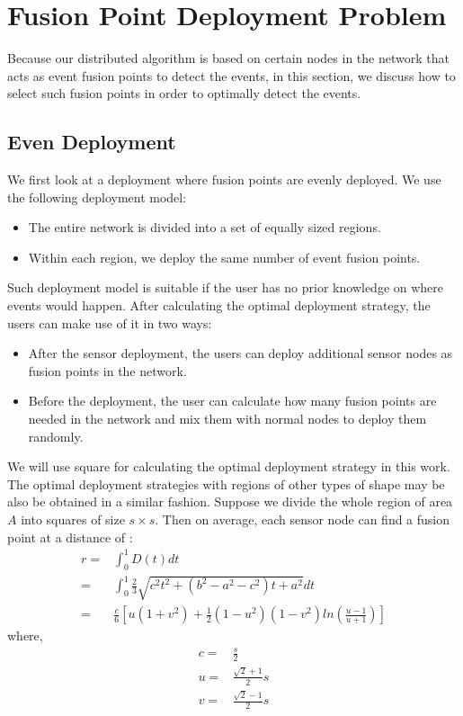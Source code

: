 \section{Fusion Point Deployment Problem}
Because our distributed algorithm is based on certain nodes in the network that acts as event fusion points to detect the events, in this section, we discuss how to select such fusion points in order to optimally detect the events.
\subsection{Even Deployment}
We first look at a deployment where fusion points are evenly deployed. We use the following deployment model:
\begin{itemize}
\item The entire network is divided into a set of equally sized regions.
\item Within each region, we deploy the same number of event fusion points. 
\end{itemize}

Such deployment model is suitable if the user has no prior knowledge on where events would happen. After calculating the optimal deployment strategy, the users can make use of it in two ways:
\begin{itemize}
\item After the sensor deployment, the users can deploy additional sensor nodes as fusion points in the network.
\item Before the deployment, the user can calculate how many fusion points are needed in the network and mix them with normal nodes to deploy them randomly.
\end{itemize}
We will use square for calculating the optimal deployment strategy in this work. The optimal deployment strategies with regions of other types of shape may be also be obtained in a similar fashion. Suppose we divide the whole region of area \(A\) into squares of size \(s\times s\). Then on average, each sensor node can find a fusion point at a distance of \cite{vertexDistance}:
\begin{align}
r=&\int_0^1D(t)dt\nonumber\\
=&\int_0^1\frac{2}{3}\sqrt{c^2t^2+(b^2-a^2-c^2)t+a^2}dt\nonumber\\
=&\frac{c}{6}[u(1+v^2)+\frac{1}{2}(1-u^2)(1-v^2)ln(\frac{u-1}{u+1})]\label{eq:avgdist1}
\end{align}
where,
\begin{align}
c=&\frac{s}{2}\nonumber\\
u=&\frac{\sqrt{2}+1}{2}s\nonumber\\
v=&\frac{\sqrt{2}-1}{2}s\label{eq:avgdist2}
\end{align}

